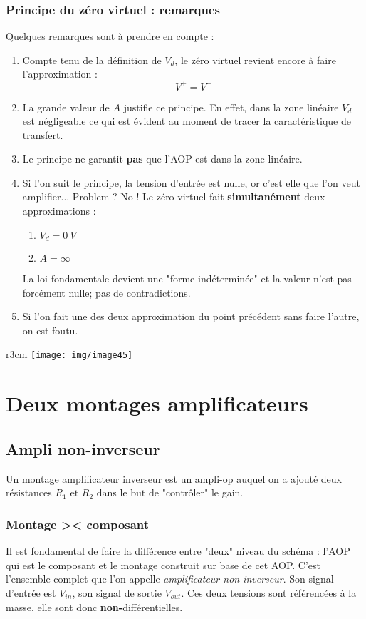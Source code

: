 \subsubsection{Principe du zéro virtuel : remarques}
Quelques remarques sont à prendre en compte :
\begin{enumerate}
\item Compte tenu de la définition de $V_d$, le zéro virtuel revient encore à faire l'approximation :
\begin{equation}
V^+ = V^-
\end{equation}
\item La grande valeur de $A$ justifie ce principe. En effet, dans la zone linéaire $V_d$ est négligeable ce qui est évident au moment de tracer la caractéristique de transfert.
\item Le principe ne garantit \textbf{pas} que l'AOP est dans la zone linéaire.
\item Si l'on suit le principe, la tension d'entrée est nulle, or c'est elle que l'on veut amplifier... Problem ? No ! Le zéro virtuel fait \textbf{simultanément} deux approximations :
\begin{enumerate}
\item $V_d = 0\ V$
\item $A = \infty$
\end{enumerate}
La loi fondamentale devient une "forme indéterminée" et la valeur n'est pas forcément nulle; pas de contradictions.
\item Si l'on fait une des deux approximation du point précédent sans faire l'autre, on est foutu.
\end{enumerate}

\begin{wrapfigure}[9]{r}{3cm}
\texttt{[image: img/image45]}
\end{wrapfigure}
\section{Deux montages amplificateurs}
\subsection{Ampli non-inverseur}
Un montage amplificateur inverseur est un ampli-op auquel on a ajouté deux résistances $R_1$ et $R_2$ dans le but de "contrôler" le gain. 

\subsubsection{Montage >< composant}
Il est fondamental de faire la différence entre "deux" niveau du schéma : l'AOP qui est le composant et le montage construit sur base de cet AOP. C'est l'ensemble complet que l'on appelle \textit{amplificateur non-inverseur}. Son signal d'entrée est $V_{in}$, son signal de sortie $V_{out}$. Ces deux tensions sont référencées à la masse, elle sont donc \textbf{non-}différentielles.\\

